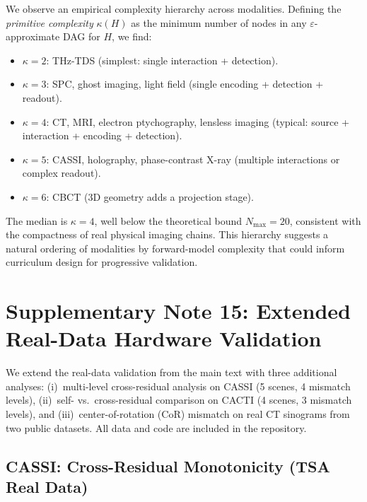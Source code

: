 \documentclass[11pt]{article}
\theoremstyle{definition}
\begin{document}
We observe an empirical complexity hierarchy across modalities.
Defining the \emph{primitive complexity} $\kappa(H)$ as the minimum
number of nodes in any $\varepsilon$-approximate DAG for $H$, we find:

\begin{itemize}
  \item $\kappa = 2$: THz-TDS (simplest: single interaction + detection).
  \item $\kappa = 3$: SPC, ghost imaging, light field (single encoding + detection + readout).
  \item $\kappa = 4$: CT, MRI, electron ptychography, lensless imaging (typical: source + interaction + encoding + detection).
  \item $\kappa = 5$: CASSI, holography, phase-contrast X-ray (multiple interactions or complex readout).
  \item $\kappa = 6$: CBCT (3D geometry adds a projection stage).
\end{itemize}

\noindent The median is $\kappa = 4$, well below the theoretical bound
$N_{\max} = 20$, consistent with the compactness of real physical imaging
chains. This hierarchy suggests a natural ordering of modalities by
forward-model complexity that could inform curriculum design for
progressive validation.


\section{Supplementary Note 15: Extended Real-Data Hardware Validation}
\label{sec:real_data_extended}

We extend the real-data validation from the main text with three additional analyses:
(i)~multi-level cross-residual analysis on CASSI (5 scenes, 4 mismatch levels),
(ii)~self- vs.\ cross-residual comparison on CACTI (4 scenes, 3 mismatch levels),
and (iii)~center-of-rotation (CoR) mismatch on real CT sinograms from two public datasets.
All data and code are included in the repository.

\subsection{CASSI: Cross-Residual Monotonicity (TSA Real Data)}
\label{sec:cassi_cross}
\end{document}
